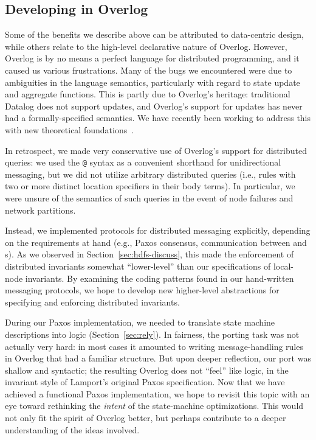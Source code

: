 \subsection{Developing in Overlog}
\label{sec:overlog-lessons}
Some of the benefits we describe above can be attributed to data-centric design,
while others relate to the high-level declarative nature of Overlog.  However,
Overlog is by no means a perfect language for distributed programming, and it
caused us various frustrations.  Many of the bugs we encountered were due to
ambiguities in the language semantics, particularly with regard to state update
and aggregate functions. This is partly due to Overlog's heritage: traditional
Datalog does not support updates, and Overlog's support for updates has never
had a formally-specified semantics. We have recently been working to address
this with new theoretical foundations~\cite{dedalus-tr}.

In retrospect, we made very conservative use of Overlog's support for
distributed queries: we used the \texttt{@} syntax as a convenient shorthand for
unidirectional messaging, but we did not utilize arbitrary distributed queries
(i.e., rules with two or more distinct location specifiers in their body
terms). In particular, we were unsure of the semantics of such queries in the
event of node failures and network partitions.

Instead, we implemented protocols for distributed messaging explicitly,
depending on the requirements at hand (e.g., Paxos consensus, communication
between {\NN} and {\DN}s). As we observed in Section~\ref{sec:hdfs-discuss},
this made the enforcement of distributed invariants somewhat ``lower-level''
than our specifications of local-node invariants. By examining the coding
patterns found in our hand-written messaging protocols, we hope to develop new
higher-level abstractions for specifying and enforcing distributed invariants.

During our Paxos implementation, we needed to translate state machine
descriptions into logic (Section~\ref{sec:rely}).  In fairness, the porting task
was not actually very hard: in most cases it amounted to writing
message-handling rules in Overlog that had a familiar structure.  But upon
deeper reflection, our port was shallow and syntactic; the resulting Overlog
does not ``feel'' like logic, in the invariant style of Lamport's original Paxos
specification. Now that we have achieved a functional Paxos implementation, we
hope to revisit this topic with an eye toward rethinking the \emph{intent} of the
state-machine optimizations.  This would not only fit the spirit of Overlog
better, but perhaps contribute to a deeper understanding of the ideas involved.

